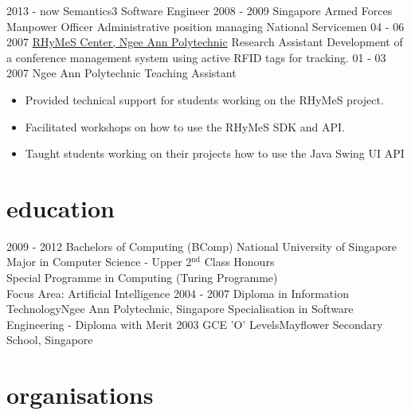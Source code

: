 \documentclass[]{friggeri-cv}
\begin{document}
\begin{entrylist}
	\entry
	{2013 - now}
	{Semantics3}
	{Software Engineer}
	{}
	\entry
	{2008 - 2009}
	{Singapore Armed Forces}
	{Manpower Officer}
	{Administrative position managing National Servicemen}
	\entry
	{04 - 06 2007}
	{\href{http://www.np.edu.sg/ict/facilities/rhymes/Pages/loc\_rhymes.aspx}{RHyMeS Center, Ngee Ann Polytechnic}}
	{Research Assistant}
	{Development of a conference management system using active RFID tags for 
	tracking.}
	\entry
	{01 - 03 2007}
	{Ngee Ann Polytechnic}
	{Teaching Assistant}
	{
		\begin{itemize}[itemsep=0pt,topsep=0pt]
			\item Provided technical support for students working on the RHyMeS 
				project.
			\item Facilitated workshops on how to use the RHyMeS SDK and API.
			\item  Taught students working on their projects how to use the Java 
				Swing UI API
		\end{itemize}
	}
\end{entrylist}

\section{education}

\begin{entrylist}
	\entry
	{2009 - 2012}
	{Bachelors of Computing (BComp)}
	{National University of Singapore}
	{
		Major in Computer Science - Upper 2$^{\text{nd}}$ Class Honours \\
		Special Programme in Computing (Turing Programme) \\
		Focus Area: Artificial Intelligence
	}
	\entry
	{2004 - 2007}
	{Diploma in Information Technology}{Ngee Ann Polytechnic, Singapore}
	{Specialisation in Software Engineering - Diploma with Merit}
	\entry
	{2003}
	{GCE 'O' Levels}{Mayflower Secondary School, Singapore}
	{}
\end{entrylist}


\section{organisations}
\end{document}

